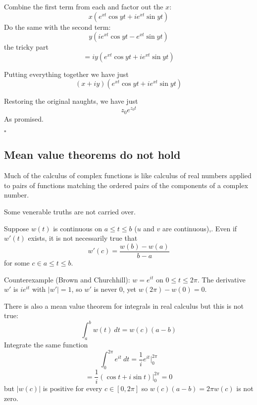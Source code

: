\documentclass[11pt, oneside]{article}
\begin{document}
Combine the first term from each and factor out the $x$:
\[ x(e^{xt} \cos yt +  ie^{xt} \sin yt) \]
Do the same with the second term:
\[ y(ie^{xt} \cos yt - e^{xt} \sin yt) \]
the tricky part
\[ = iy(e^{xt} \cos yt + ie^{xt} \sin yt) \]

Putting everything together we have just
\[ (x + iy)(e^{xt} \cos yt + ie^{xt} \sin yt) \]

Restoring the original naughts, we have just
\[ z_0 e^{z_0 t} \]
As promised.

$\square$

\subsection*{Mean value theorems do not hold}
Much of the calculus of complex functions is like calculus of real numbers applied to pairs of functions matching the ordered pairs of the components of a complex number.

Some venerable truths are not carried over.

Suppose $w(t)$ is continuous on $a \le t \le b$ ($u$ and $v$ are continuous),.  Even if $w'(t)$ exists, it is not necessarily true that
\[ w'(c) = \frac{w(b) - w(a)}{b - a} \]
for some $c \in a \le t \le b$.

Counterexample (Brown and Churchhill):  $w = e^{it}$ on $0 \le t \le 2 \pi$.  The derivative $w'$ is $ie^{it}$ with $|w'| = 1$, so $w'$ is never $0$, yet $w(2 \pi) - w(0) = 0$.

There is also a mean value theorem for integrals in real calculus but this is not true:
\[ \int_a^b w(t) \ dt = w(c) (a - b) \]
Integrate the same function
\[ \int_0^{2 \pi} e^{it} \ dt = \frac{1}{i} e^{it} \bigg |_0^{2 \pi} \]
\[ = \frac{1}{i} (\cos t + i \sin t) \bigg |_0^{2 \pi} = 0 \]
but $|w(c)|$ is positive for every $c \in [0,2 \pi]$ so $w(c) (a - b) = 2 \pi w(c)$ is not zero.
\end{document}
